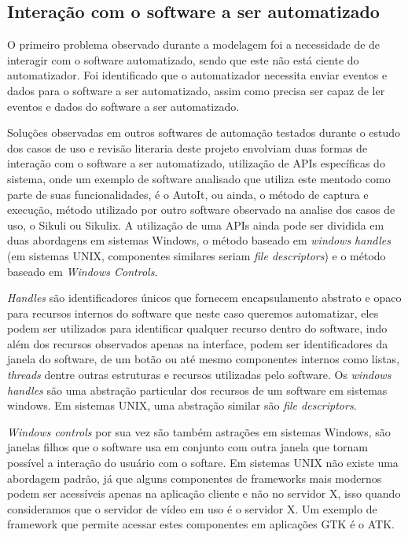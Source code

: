 \documentclass[tg]{mdtufsm}
\begin{document}
            \subsection {Interação com o software a ser automatizado}

                O primeiro problema observado durante a modelagem foi a necessidade de de interagir com o software automatizado, sendo que este não está ciente do automatizador. Foi identificado que o automatizador necessita enviar eventos e dados para o software a ser automatizado, assim como precisa ser capaz de ler eventos e dados do software a ser automatizado.

                Soluções observadas em outros softwares de automação testados durante o estudo dos casos de uso e revisão literaria deste projeto envolviam duas formas de interação com o software a ser automatizado, utilização de APIs específicas do sistema, onde um exemplo de software analisado que utiliza este mentodo como parte de suas funcionalidades, é o AutoIt, ou ainda, o método de captura e execução, método utilizado por outro software observado na analise dos casos de uso, o Sikuli ou Sikulix. A utilização de uma APIs ainda pode ser dividida em duas abordagens em sistemas Windows, o método baseado em \emph{windows handles} (em sistemas UNIX, componentes similares seriam \emph{file descriptors}) e o método baseado em \emph{Windows Controls}.

                \emph{Handles} são identificadores únicos que fornecem encapsulamento abstrato e opaco para recursos internos do software que neste caso queremos automatizar, eles podem ser utilizados para identificar qualquer recurso dentro do software, indo além dos recursos observados apenas na interface, podem ser identificadores da janela do software, de um botão ou até mesmo componentes internos como listas, \emph{threads} dentre outras estruturas e recursos utilizadas pelo software. Os \emph{windows handles} são uma abstração particular dos recursos de um software em sistemas windows. Em sistemas UNIX, uma abstração similar são \emph{file descriptors}.

                \emph{Windows controls} por sua vez são também astrações em sistemas Windows, são janelas filhos que o software usa em conjunto com outra janela que tornam possível a interação do usuário com o softare. Em sistemas UNIX não existe uma abordagem padrão, já que alguns componentes de frameworks mais modernos podem ser acessíveis apenas na aplicação cliente e não no servidor X, isso quando consideramos que o servidor de vídeo em uso é o servidor X. Um exemplo de framework que permite acessar estes componentes em aplicações GTK é o ATK.
\end{document}
